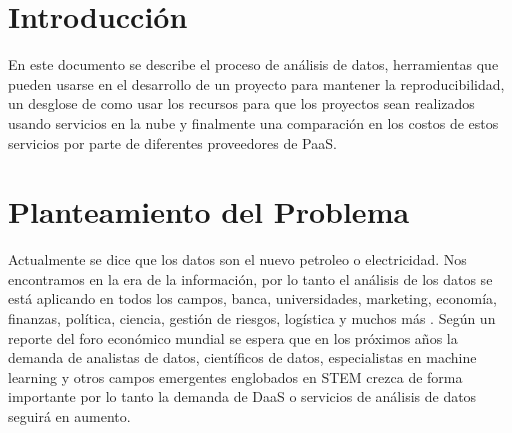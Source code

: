 \documentclass[12pt,a4paper,openright]{article}
\begin{document}

\tableofcontents %


\newpage


\section{Introducci\'on}

En este documento se describe el proceso de análisis de datos, herramientas que pueden usarse en el desarrollo de un proyecto para mantener la reproducibilidad, un desglose de como usar los recursos para que los proyectos sean realizados usando servicios en la nube y finalmente una comparación en los costos de estos servicios por parte de diferentes proveedores de PaaS.


\section{Planteamiento del Problema}

Actualmente se dice que los datos son el nuevo petroleo o electricidad. Nos encontramos en la era de la información, por lo tanto el análisis de los datos se está aplicando en todos los campos, banca, universidades, marketing, econom\'ia, finanzas, pol\'itica, ciencia, gesti\'on de riesgos, log\'istica y muchos m\'as . Según un reporte del foro económico mundial se espera que en los próximos años la demanda de analistas de datos, científicos de datos, especialistas en machine learning y otros campos emergentes englobados en STEM crezca de forma importante por lo tanto la demanda de DaaS o servicios de an\'alisis de datos seguirá en aumento.
\end{document}
